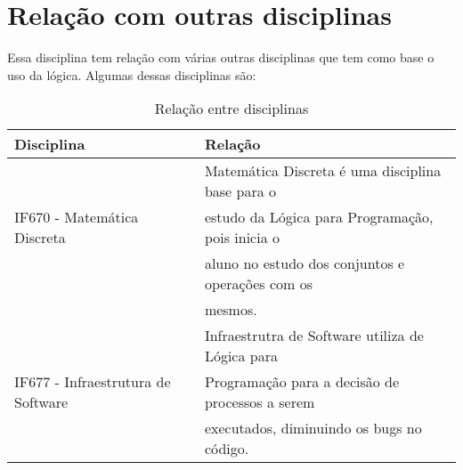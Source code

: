 \documentclass[10pt]{article}
\begin{document}
\section{Relação com outras disciplinas}
Essa disciplina tem relação com várias outras disciplinas que tem como base o uso da lógica. Algumas dessas disciplinas são:
\begin{table}[h]
    \centering
    \begin{tabular}{|l|l|}
    \hline    Disciplina & Relação \\
    \hline     & Matemática Discreta é uma disciplina base para o  \\
         IF670 - Matemática Discreta & estudo da Lógica para Programação, pois inicia o\\
          & aluno no estudo dos conjuntos e operações com os\\
          & mesmos.\citep{site5}\\
    \hline & Infraestrutra de Software utiliza de Lógica para \\
      IF677 -  Infraestrutura de Software & Programação para a decisão de processos a serem \\
        & executados, diminuindo os bugs no código.\citep{site6}\\
    \hline
    \end{tabular}
    \caption{Relação entre disciplinas \citep{site2} \citep{site3}}
    \label{tab:my_label}
\end{table}



\end{document}
